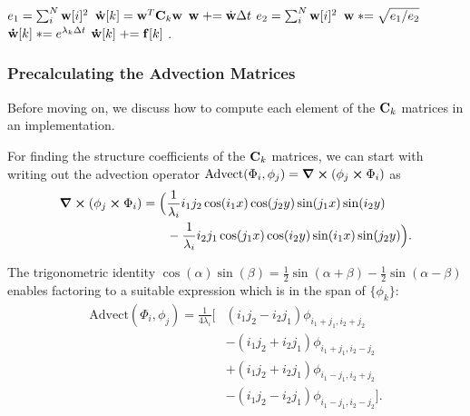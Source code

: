 \begin{algorithmic}
    \State $e_1 = \sum_i^N \vb{w}[i]^2$ 
        \State $\vb{\dot{w}}[k] = \vb{w}^T \vb{C}_k \vb{w}$
    \EndFor 
    \State $\vb{w} \mathrel{+}= \dot{\vb{w}} \Delta t$
    \State $e_2 = \sum_i^N \vb{w}[i]^2$ 
    \State $\vb{w} \mathrel{*}= \sqrt{e_1 / e_2}$
    \State $\vb{\dot{w}}[k] \mathrel{*}= e^{\lambda_k \Delta t}$
    \State $\vb{\dot{w}}[k] \mathrel{+}= \vb{f}[k]$
    \EndFor.
\end{algorithmic}

\subsubsection*{Precalculating the Advection Matrices}
Before moving on, we discuss how to compute each element of the $\vb{C}_k$
matrices in an implementation.

For finding the structure coefficients of the $\vb{C}_k$ matrices, we can start
with writing out the advection operator $\text{Advect}(\Phi_i, \phi_j)
= \curl(\phi_j \cross \Phi_i)$ as
\begin{align*}
\curl(\phi_j \cross \Phi_i) = \Big(
    &\frac{1}{\lambda_i}i_1j_2\cos(i_1x)\cos(j_2y)\sin(j_1x)\sin(i_2y)\\
    &-\frac{1}{\lambda_i}i_2j_1\cos(j_1x)\cos(i_2y)\sin(i_1x)\sin(j_2y)
\Big).
\end{align*}

The trigonometric identity $\cos(\alpha)\sin(\beta)
= \frac{1}{2}\sin(\alpha+\beta)-\frac{1}{2}\sin(\alpha-\beta)$ enables factoring
to a suitable expression which is in the span of $\{\phi_k\}$:
\begin{align*}
\text{Advect}(\Phi_i,\phi_j)= \frac{1}{4\lambda_{i}}
    \Big[&(i_1 j_2 - i_2 j_1)\phi_{i_1+j_1, i_2+j_2}\\
     &-(i_1 j_2 + i_2 j_1)\phi_{i_1+j_1, i_2-j_2}\\
     &+(i_1 j_2 + i_2 j_1)\phi_{i_1-j_1, i_2+j_2}\\
     &-(i_1 j_2 - i_2 j_1)\phi_{i_1-j_1, i_2-j_2}\Big].\\
\end{align*}


